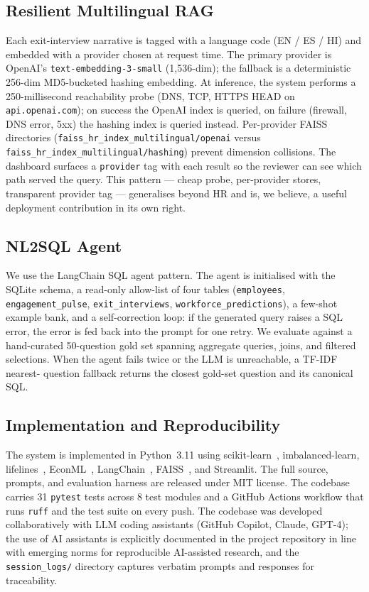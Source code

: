 \documentclass[conference]{IEEEtran}
\begin{document}
\subsection{Resilient Multilingual RAG}
Each exit-interview narrative is tagged with a language code (EN /
ES / HI) and embedded with a provider chosen at request time. The
primary provider is OpenAI's
\texttt{text-embedding-3-small} (1{,}536-dim); the fallback is a
deterministic 256-dim MD5-bucketed hashing embedding. At inference,
the system performs a 250-millisecond reachability probe (DNS, TCP,
HTTPS HEAD on \texttt{api.openai.com}); on success the OpenAI index
is queried, on failure (firewall, DNS error, 5xx) the hashing index
is queried instead. Per-provider FAISS directories
(\texttt{faiss\_hr\_index\_multilingual/openai} versus
\texttt{faiss\_hr\_index\_multilingual/hashing}) prevent dimension
collisions. The dashboard surfaces a \texttt{provider} tag with
each result so the reviewer can see which path served the query.
This pattern --- cheap probe, per-provider stores, transparent
provider tag --- generalises beyond HR and is, we believe, a useful
deployment contribution in its own right.

\subsection{NL2SQL Agent}
We use the LangChain SQL agent pattern. The agent is initialised
with the SQLite schema, a read-only allow-list of four tables
(\texttt{employees}, \texttt{engagement\_pulse},
\texttt{exit\_interviews}, \texttt{workforce\_predictions}), a
few-shot example bank, and a self-correction loop: if the generated
query raises a SQL error, the error is fed back into the prompt for
one retry. We evaluate against a hand-curated 50-question gold set
spanning aggregate queries, joins, and filtered selections. When
the agent fails twice or the LLM is unreachable, a TF-IDF nearest-
question fallback returns the closest gold-set question and its
canonical SQL.

\subsection{Implementation and Reproducibility}
The system is implemented in Python~3.11 using
scikit-learn~\cite{pedregosa2011}, imbalanced-learn,
lifelines~\cite{davidson2019}, EconML~\cite{econml2019},
LangChain~\cite{langchain2023}, FAISS~\cite{johnson2019}, and
Streamlit. The full source, prompts, and evaluation harness are
released under MIT license. The codebase carries 31 \texttt{pytest}
tests across 8 test modules and a GitHub Actions workflow that runs
\texttt{ruff} and the test suite on every push. The codebase was
developed collaboratively with LLM coding assistants (GitHub
Copilot, Claude, GPT-4); the use of AI assistants is explicitly
documented in the project repository in line with emerging norms
for reproducible AI-assisted research, and the
\texttt{session\_logs/} directory captures verbatim prompts and
responses for traceability.
\end{document}
